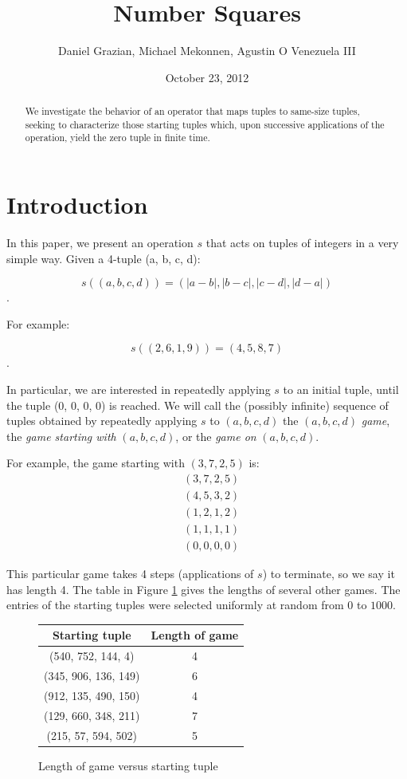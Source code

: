 \documentclass[12pt]{amsart}
\title{Number Squares}
\author{Daniel Grazian, Michael Mekonnen, Agustin O Venezuela III}
\date{October 23, 2012}
\newcommand{\diff}{s}
\begin{document}
\begin{abstract}
We investigate the behavior of an operator that maps tuples to same-size tuples, seeking to characterize those starting tuples which, upon successive applications of the operation, yield the zero tuple in finite time.
\end{abstract}

\maketitle

\section{Introduction\label{sec:intro}}

In this paper, we present an operation $\diff$ that acts on tuples of integers in a very simple way. Given a 4-tuple (a, b, c, d):

$$\diff((a, b, c, d)) = (|a - b|, |b - c|, |c - d|, |d - a|)$$. 

For example:

$$\diff((2, 6, 1, 9)) = (4, 5, 8, 7)$$.

In particular, we are interested in repeatedly applying $\diff$ to an initial tuple, until the tuple (0, 0, 0, 0) is reached. We will call the (possibly infinite) sequence of tuples obtained by repeatedly applying $\diff$ to $(a, b, c, d)$ the $(a, b, c, d)$ \textit{game}, the \textit{game starting with} $(a, b, c, d)$, or the \textit{game on} $(a, b, c, d)$.

For example, the game starting with $(3, 7, 2, 5)$ is:
\begin{align*}
& (3, 7, 2, 5) \\
& (4, 5, 3, 2) \\
& (1, 2, 1, 2) \\
& (1, 1, 1, 1) \\
& (0, 0, 0, 0)
\end{align*}

This particular game takes 4 steps (applications of $\diff$) to terminate, so we say it has length 4. The table in Figure \ref{fig: lengthVersusStartingTuple} gives the lengths of several other games. The entries of the starting tuples were selected uniformly at random from $0$ to $1000$.

\begin{figure}
\caption{Length of game versus starting tuple}
\label{fig: lengthVersusStartingTuple}
\begin{center}
    \begin{tabular}{| c | c |}
    \hline
    Starting tuple &  Length of game\\ \hline
    (540, 752, 144, 4) & 4\\ \hline
    (345, 906, 136, 149) & 6\\ \hline
    (912, 135, 490, 150) & 4\\ \hline
    (129, 660, 348, 211) & 7 \\ \hline
    (215, 57, 594, 502) & 5 \\ \hline
    \end{tabular}
\end{center}
\end{figure}
\end{document}
